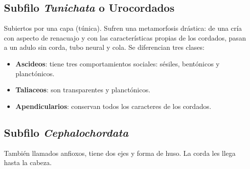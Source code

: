 \subsection{Subfilo \textit{Tunichata} o Urocordados}
Subiertos por una capa (túnica). Sufren una metamorfosis drástica: de una cría con aspecto de renacuajo y con las características propias de los cordados, pasan a un adulo sin corda, tubo neural y cola. Se diferencian tres clases:
\begin{itemize}[itemsep=0pt,parsep=0pt,topsep=0pt,partopsep=0pt]
    \item \textbf{Ascideos}: tiene tres comportamientos sociales: sésiles, bentónicos y planctónicos.
    \item\textbf{Taliaceos}: son transparentes y planctónicos.
    \item\textbf{Apendicularios}: conservan todos los caracteres de los cordados.
\end{itemize}
\subsection{Subfilo \textit{Cephalochordata}}
También llamados anfioxos, tiene dos ejes y forma de huso. La corda les llega hasta la cabeza.
